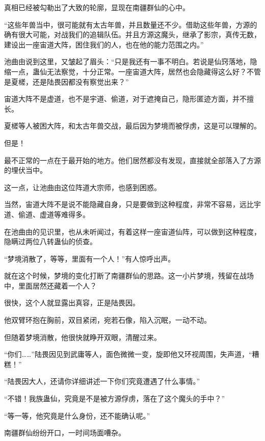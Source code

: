 
\begin{this_body}



真相已经被勾勒出了大致的轮廓，显现在南疆群仙的心中。

“这些年兽当中，很可能就有太古年兽，并且数量还不少。借助这些年兽，方源的确有很大可能，对战我们的追辑队伍。并且方源这魔头，继承了影宗，真传无数，建设出一座宙道大阵，困住我们的人，也在他的能力范围之内。”

池曲由说到这里，又皱起了眉头：“只是我还有一事不明白。若说是仙窍落地，隐缩一点，蛊仙无法察觉，十分正常。一座宙道大阵，居然也会隐藏得这么好？不管是夏槎，还是陆畏因都没有察觉出来？”

宙道大阵不是虚道，也不是宇道、偷道，对于遮掩自己，隐形匿迹方面，并不擅长。

夏槎等人被困大阵，和太古年兽交战，最后因为梦境而被俘虏，这是可以理解的。

但是！

最不正常的一点在于最开始的地方。他们居然都没有发现，直接就全部落入了方源的埋伏当中。

这一点，让池曲由这位阵道大宗师，也感到困惑。

当然，宙道大阵不是说不能隐藏自身，只是要做到这种程度，非常不容易，远比宇道、偷道、虚道等难得多。

在池曲由的见识里，也从未听闻过，有着这样一座宙道仙阵，可以做到这种程度，隐瞒过两位八转蛊仙的侦查。

“梦境消散了，等等，里面有一个人！”有人惊呼出声。

就在这个时候，梦境的变化打断了南疆群仙的思路。这一小片梦境，残留在战场中，里面居然还藏着一个人？

很快，这个人就显露出真容，正是陆畏因。

他双臂环抱在胸前，双目紧闭，宛若石像，陷入沉眠，一动不动。

但随着梦境消散，他很快就睁开双眼，清醒过来。

“你们……”陆畏因见到武庸等人，面色微微一变，旋即他又环视周围，失声道，“糟糕！”

“陆畏因大人，还请你详细讲述一下你们究竟遭遇了什么事情。”

“不错！我族蛊仙，究竟是不是被方源俘虏，落在了这个魔头的手中？”

“等一等，他究竟是什么身份，还不能确认呢。”

南疆群仙纷纷开口，一时间场面嘈杂。


\end{this_body}
